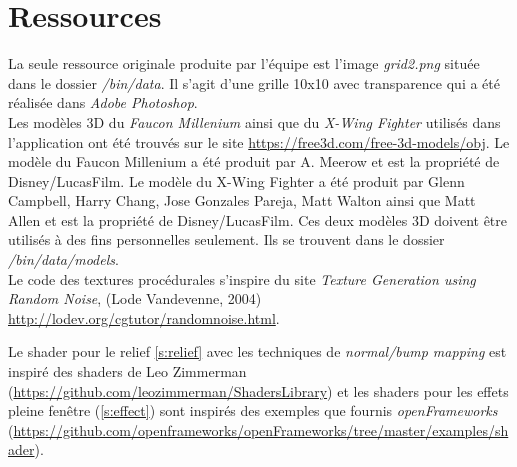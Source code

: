 \section{Ressources}
\label{s:ressources}

La seule ressource originale produite par l'équipe est l'image \textit{grid2.png} située dans le dossier \textit{/bin/data}.
Il s'agit d'une grille 10x10 avec transparence qui a été réalisée dans \textit{Adobe Photoshop}.\\

Les modèles 3D du \textit{Faucon Millenium} ainsi que du \textit{X-Wing Fighter} utilisés dans l'application ont été trouvés sur le site \url{https://free3d.com/free-3d-models/obj}.
Le modèle du Faucon Millenium a été produit par A. Meerow et est la propriété de Disney/LucasFilm.
Le modèle du X-Wing Fighter a été produit par Glenn Campbell, Harry Chang, Jose Gonzales Pareja, Matt Walton ainsi que Matt Allen et est la propriété de Disney/LucasFilm.
Ces deux modèles 3D doivent être utilisés à des fins personnelles seulement.
Ils se trouvent dans le dossier \textit{/bin/data/models}.\\ 

Le code des textures procédurales s'inspire du site \textit{Texture Generation using Random Noise}, (Lode Vandevenne, 2004) \url{http://lodev.org/cgtutor/randomnoise.html}.\\
\label{src-procedural-texture}

Le shader pour le relief \ref{s:relief} avec les techniques de \textit{normal/bump mapping} est inspiré des shaders de Leo Zimmerman (\url{https://github.com/leozimmerman/ShadersLibrary}) et les shaders pour les effets pleine fenêtre (\ref{s:effect}) sont inspirés des exemples que fournis \textit{openFrameworks} (\url{https://github.com/openframeworks/openFrameworks/tree/master/examples/shader}).
\clearpage
